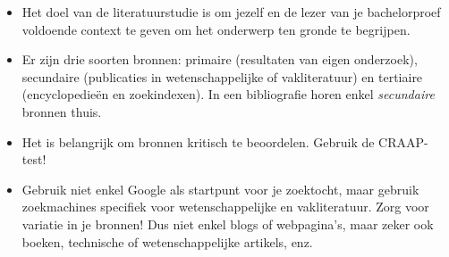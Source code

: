 \begin{itemize}
  \item Het doel van de literatuurstudie is om jezelf en de lezer van je bachelorproef voldoende context te geven om het onderwerp ten gronde te begrijpen.
  \item Er zijn drie soorten bronnen: primaire (resultaten van eigen onderzoek), secundaire (publicaties in wetenschappelijke of vakliteratuur) en tertiaire (encyclopedieën en zoekindexen). In een bibliografie horen enkel \emph{secundaire} bronnen thuis.
  \item Het is belangrijk om bronnen kritisch te beoordelen. Gebruik de CRAAP-test!
  \item Gebruik niet enkel Google als startpunt voor je zoektocht, maar gebruik zoekmachines specifiek voor wetenschappelijke en vakliteratuur. Zorg voor variatie in je bronnen! Dus niet enkel blogs of webpagina's, maar zeker ook boeken, technische of wetenschappelijke artikels, enz.
\end{itemize}
